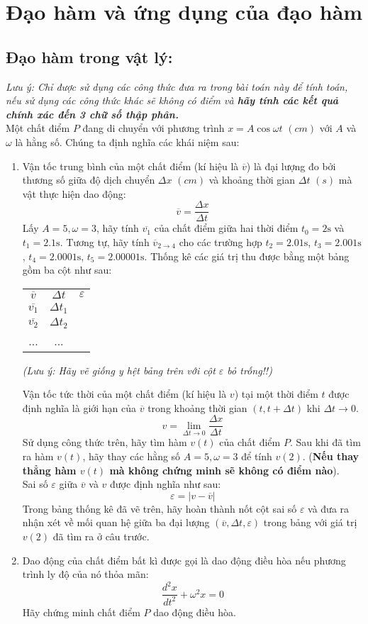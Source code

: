\documentclass[9pt]{extarticle}
\begin{document}
\section{Đạo hàm và ứng dụng của đạo hàm}
\subsection{Đạo hàm trong vật lý:}
\textit{Lưu ý: Chỉ được sử dụng các công thức đưa ra trong bài toán này để tính toán, nếu sử dụng các công thức khác sẽ không có điểm và \textbf{hãy tính các kết quả chính xác đến 3 chữ số thập phân.}}\\
Một chất điểm $P$ đang di chuyển với phương trình $x=A\cos{\omega t}$ $(cm)$ với $A$ và $\omega$ là hằng số. Chúng ta định nghĩa các khái niệm sau:
\begin{enumerate}
    \item Vận tốc trung bình của một chất điểm (kí hiệu là $\overline{v}$) là đại lượng đo bởi thương số giữa độ dịch chuyển $\Delta x$ $(cm)$ và khoảng thời gian $\Delta t$ $(s)$ mà vật thực hiện dao động: $$\overline{v}=\frac{\Delta x}{\Delta t}$$ Lấy $A=5,\omega=3$, hãy tính $\overline{v_{1}}$ của chất điểm giữa hai thời điểm $t_{0}=2 \text{s}$ và $t_{1}=2.1\text{s}$. Tương tự, hãy tính $\overline{v}_{2\to4}$ cho các trường hợp $t_{2}=2.01\text{s}$, $t_{3}=2.001\text{s}$, $t_{4}=2.0001\text{s}$, $t_{5}=2.00001\text{s}$.
Thống kê các giá trị thu được bằng một bảng gồm ba cột như sau:
\begin{center}
    \begin{tabular}{ c| c|c }
     $\overline{v}$ & $\Delta t$&$\varepsilon$  \\ 
     $\overline{v_{1}}$ & $\Delta t_{1}$  \\  
     $\overline{v_{2}}$&  $\Delta t_{2}$ \\  
     ... & ...\\
    \end{tabular}
    \end{center}
    \begin{center}
        \textit{(Lưu ý: Hãy vẽ giống y hệt bảng trên với cột $\varepsilon$ bỏ trống!!)}
    \end{center}
 Vận tốc tức thời của một chất điểm (kí hiệu là $v$) tại một thời điểm $t$ được định nghĩa là giới hạn của $\overline{v}$ trong khoảng thời gian $(t,t+\Delta t)$ khi $\Delta t\to0$.
$$v=\lim_{\Delta t\to 0}\frac{\Delta x}{\Delta t}$$
Sử dụng công thức trên, hãy tìm hàm $v(t)$ của chất điểm $P$. Sau khi đã tìm ra hàm $v(t)$, hãy thay các hằng số $A=5,\omega=3$ để tính $v(2)$. (\textbf{Nếu thay
thẳng hàm $v(t)$ mà không chứng minh sẽ không có điểm nào}).
    \\ Sai số $\varepsilon$ giữa $\overline{v}$ và $v$ được định nghĩa như sau: $$\varepsilon=|v-\overline{v}|$$
Trong bảng thống kê đã vẽ trên, hãy hoàn thành nốt cột sai số $\varepsilon$ và đưa ra nhận xét về mối quan hệ giữa ba đại lượng $(\overline{v},\Delta t,\varepsilon)$ trong bảng với giá trị $v(2)$ đã tìm ra ở câu trước.
    \item Dao động của chất điểm bất kì được gọi là dao động điều hòa nếu phương trình ly độ của nó thỏa mãn:
     $$\frac{d^2x}{dt^2}+\omega^2x=0$$
Hãy chứng minh chất điểm $P$ dao động điều hòa.
\end{enumerate}
\end{document}

